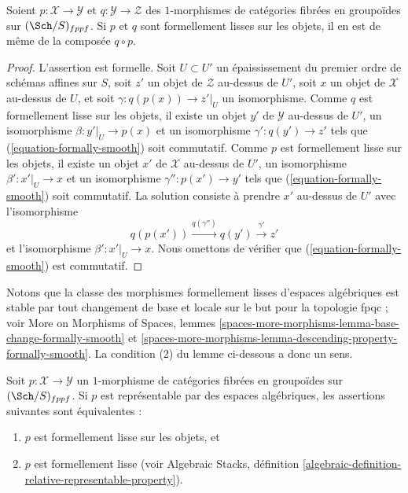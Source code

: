 \begin{lemma}
\label{lemma-composition-formally-smooth}
Soient $p : \mathcal{X} \to \mathcal{Y}$ et $q : \mathcal{Y} \to \mathcal{Z}$
des $1$-morphismes de catégories fibrées en groupoïdes sur $(\Sch/S)_{fppf}$.
Si $p$ et $q$ sont formellement lisses sur les objets, il en est de même de la composée
$q \circ p$.
\end{lemma}

\begin{proof}
L'assertion est formelle. Soit $U \subset U'$ un épaississement du premier ordre
de schémas affines sur $S$, soit $z'$ un objet de $\mathcal{Z}$
au-dessus de $U'$, soit $x$ un objet de $\mathcal{X}$ au-dessus de $U$,
et soit $\gamma : q(p(x)) \to z'|_U$ un isomorphisme. Comme $q$ est
formellement lisse sur les objets, il existe un objet
$y'$ de $\mathcal{Y}$ au-dessus de $U'$, un isomorphisme
$\beta : y'|_U \to p(x)$ et un isomorphisme $\gamma' : q(y') \to z'$
tels que (\ref{equation-formally-smooth}) soit commutatif. Comme $p$ est
formellement lisse sur les objets, il existe un objet
$x'$ de $\mathcal{X}$ au-dessus de $U'$, un isomorphisme
$\beta' : x'|_U \to x$ et un isomorphisme $\gamma'' : p(x') \to y'$
tels que (\ref{equation-formally-smooth}) soit commutatif.
La solution consiste à prendre $x'$ au-dessus de $U'$ avec l'isomorphisme
$$
q(p(x')) \xrightarrow{q(\gamma'')} q(y') \xrightarrow{\gamma'} z'
$$
et l'isomorphisme $\beta' : x'|_U \to x$. Nous omettons de vérifier
que (\ref{equation-formally-smooth}) est commutatif.
\end{proof}

\noindent
Notons que la classe des morphismes formellement lisses d'espaces algébriques est
stable par tout changement de base et locale sur le but pour la
topologie fpqc ; voir
More on Morphisms of Spaces,
lemmes \ref{spaces-more-morphisms-lemma-base-change-formally-smooth} et
\ref{spaces-more-morphisms-lemma-descending-property-formally-smooth}.
La condition (2) du lemme ci-dessous a donc un sens.

\begin{lemma}
\label{lemma-representable-by-spaces-formally-smooth}
Soit $p : \mathcal{X} \to \mathcal{Y}$ un $1$-morphisme de catégories
fibrées en groupoïdes sur $(\Sch/S)_{fppf}$. Si $p$ est
représentable par des espaces algébriques, les assertions suivantes sont équivalentes :
\begin{enumerate}
\item $p$ est formellement lisse sur les objets, et
\item $p$ est formellement lisse (voir
Algebraic Stacks,
définition \ref{algebraic-definition-relative-representable-property}).
\end{enumerate}
\end{lemma}

